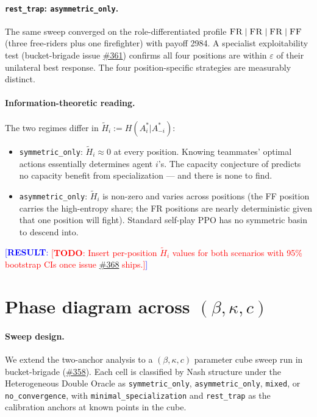 \documentclass{article}
\newcommand{\TODO}[1]{\textcolor{red}{[\textbf{TODO}: #1]}}
\newcommand{\RESULT}[1]{\textcolor{blue}{[\textbf{RESULT}: #1]}}
\begin{document}
\paragraph{\texttt{rest\_trap}: \texttt{asymmetric\_only}.}
The same sweep converged on the role-differentiated profile
$\textsc{FR} \mid \textsc{FR} \mid \textsc{FR} \mid \textsc{FF}$ (three free-riders
plus one firefighter) with payoff 2984.  A specialist exploitability test
(bucket-brigade issue
\href{https://github.com/rjwalters/bucket-brigade/issues/361}{\#361}) confirms
all four positions are within $\varepsilon$ of their unilateral best response.
The four position-specific strategies are measurably distinct.

\paragraph{Information-theoretic reading.}
The two regimes differ in $\tilde{H}_i := H(A_i^*|A_{-i}^*)$:
\begin{itemize}
  \item \texttt{symmetric\_only}: $\tilde{H}_i \approx 0$ at every position.
    Knowing teammates' optimal actions essentially determines agent $i$'s.
    The capacity conjecture of \cite{walters2026slepianwolf} predicts no
    capacity benefit from specialization — and there is none to find.
  \item \texttt{asymmetric\_only}: $\tilde{H}_i$ is non-zero and varies across
    positions (the FF position carries the high-entropy share; the FR positions
    are nearly deterministic given that one position will fight).  Standard
    self-play PPO has no symmetric basin to descend into.
\end{itemize}

\RESULT{\TODO{Insert per-position $\tilde{H}_i$ values for both scenarios with
95\% bootstrap CIs once issue
\href{https://github.com/rjwalters/bucket-brigade/issues/368}{\#368} ships.}}

\section{Phase diagram across $(\beta, \kappa, c)$}
\label{sec:heterogeneous-nash}

\paragraph{Sweep design.}
We extend the two-anchor analysis to a $(\beta, \kappa, c)$ parameter cube
sweep run in bucket-brigade
(\href{https://github.com/rjwalters/bucket-brigade/issues/358}{\#358}).
Each cell is classified by Nash structure under the Heterogeneous Double
Oracle as \texttt{symmetric\_only}, \texttt{asymmetric\_only}, \texttt{mixed},
or \texttt{no\_convergence}, with \texttt{minimal\_specialization} and
\texttt{rest\_trap} as the calibration anchors at known points in the cube.
\end{document}

